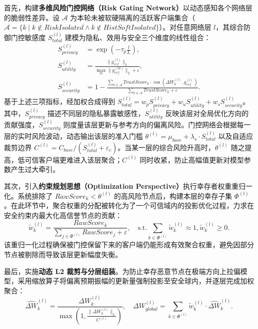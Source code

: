 \documentclass[11pt, a4paper, UTF8, fontset=fandol]{ctexart}
\begin{document}
首先，构建\textbf{多维风险门控网络（Risk Gating Network）}以动态感知各个网络层的脆弱性差异。设 $\mathcal{A}$ 为本轮未被软硬隔离的活跃客户端集合（$\mathcal{A} = \{k \mid k \notin RiskIsolated \land k \notin HistSoftIsolated\}$）。对任意网络层 $l$，其综合防御门控敏感度 $S_{total}^{(l)}$ 建模为隐私、效用与安全三个维度的线性组合：
\begin{align}
    S_{privacy}^{(l)}  & = \exp\left(-\tau_{p} \frac{l}{L}\right),                                                                                                          \\
    S_{utility}^{(l)}  & = \frac{\|g_{ref}^{(l)}\|_{2}}{\max_{m}\|g_{ref}^{(m)}\|_{2} + \varepsilon},                                                                       \\
    S_{security}^{(l)} & = 1 - \frac{\sum_{k\in\mathcal{A}}TrustScore_{k}\cdot\cos(\Delta W_{k}^{(l)}, g_{ref}^{(l)})}{\sum_{k\in\mathcal{A}}TrustScore_{k} + \varepsilon}.
\end{align}
基于上述三项指标，经加权合成得到 $S_{total}^{(l)} = w_p S_{privacy}^{(l)} + w_u S_{utility}^{(l)} + w_s S_{security}^{(l)}$。其中，$S_{privacy}^{(l)}$ 描述不同层的隐私暴露敏感性，$S_{utility}^{(l)}$ 反映该层对全局优化方向的贡献强度，$S_{security}^{(l)}$ 则度量该层更新与参考方向的偏离风险。门控网络会根据每一层的实时风险波动，动态输出该层的准入门槛 $\theta^{(l)} = \mu_{base} + \lambda_s \cdot S_{total}^{(l)}$ 以及自适应裁剪边界 $C^{(l)} = C_{base} / (S_{total}^{(l)} + \varepsilon_c)$。当某一层的综合风险升高时，$\theta^{(l)}$ 随之提高，低可信客户端更难进入该层聚合；$C^{(l)}$ 同时收紧，防止高幅值更新对模型参数产生过大牵引。

其次，引入\textbf{约束规划思想（Optimization Perspective）}执行幸存者权重重归一化。系统排除了 $RawScore_k < \theta^{(l)}$ 的高风险节点后，构建本层的幸存子集 $\Phi^{(l)}$。在此环节中，聚合权重的分配被转化为了一个可信域内的投影优化过程，力求在安全约束内最大化高信誉节点的贡献：
\begin{equation}
    \tilde{w}_{k}^{(l)} = \frac{RawScore_{k}}{\sum_{j\in\Phi^{(l)}}RawScore_{j} + \varepsilon}, \quad \text{s.t.} \sum_{k\in\Phi^{(l)}} \tilde{w}_{k}^{(l)} \approx 1, \tilde{w}_{k}^{(l)} \ge 0.
\end{equation}
该重归一化过程确保被门控保留下来的客户端仍能形成有效聚合权重，避免因部分节点被剔除而导致该层更新幅度失衡。

最后，实施\textbf{动态 L2 裁剪与分层组装}。为防止幸存恶意节点在极端方向上拉偏模型，采用缩放算子将偏离预期振幅的更新量强制投影至安全球内，并逐层完成加权聚合：
\begin{equation}
    \widehat{\Delta W}_{k}^{(l)} = \frac{\Delta W_{k}^{(l)}}{\max\left(1, \frac{\|\Delta W_{k}^{(l)}\|_{2}}{C^{(l)}}\right)}, \quad \Delta W_{global}^{(l)} = \sum_{k\in\Phi^{(l)}}\tilde{w}_{k}^{(l)} \cdot \widehat{\Delta W}_{k}^{(l)}.
\end{equation}
\end{document}
